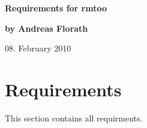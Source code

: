 \documentclass{article}
\begin{document}
\thispagestyle{empty}

\vfill

{\LARGE\textbf{Requirements for rmtoo}}

\vfill

{\Large\textbf{by Andreas Florath}}

\vfill

08. February 2010

\vfill

\newpage

\tableofcontents

\newpage

\section{Requirements}
This section contains all requirments.




\end{document}
